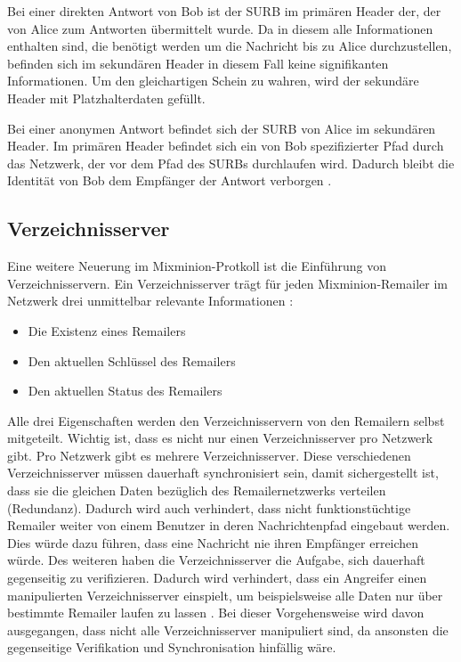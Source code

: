 Bei einer direkten Antwort von Bob ist der SURB im primären Header der, der von Alice zum Antworten übermittelt wurde. Da in diesem alle Informationen enthalten sind, die benötigt werden um die Nachricht bis zu Alice durchzustellen, befinden sich im sekundären Header in diesem Fall keine signifikanten Informationen. Um den gleichartigen Schein zu wahren, wird der sekundäre Header mit Platzhalterdaten gefüllt.

Bei einer anonymen Antwort befindet sich der SURB von Alice im sekundären Header. Im primären Header befindet sich ein von Bob spezifizierter Pfad durch das Netzwerk, der vor dem Pfad des SURBs durchlaufen wird. Dadurch bleibt die Identität von Bob dem Empfänger der Antwort verborgen \cite[S. 4]{mixminion}.

\subsection{Verzeichnisserver}
Eine weitere Neuerung im Mixminion-Protkoll ist die Einführung von Verzeichnisservern. Ein Verzeichnisserver trägt für jeden Mixminion-Remailer im Netzwerk drei unmittelbar relevante Informationen \cite[S. 8]{mixminion}:
\begin{itemize}
\item Die Existenz eines Remailers
\item Den aktuellen Schlüssel des Remailers
\item Den aktuellen Status des Remailers
\end{itemize}

Alle drei Eigenschaften werden den Verzeichnisservern von den Remailern selbst mitgeteilt.
Wichtig ist, dass es nicht nur einen Verzeichnisserver pro Netzwerk gibt. Pro Netzwerk gibt es mehrere Verzeichnisserver. Diese verschiedenen Verzeichnisserver müssen dauerhaft synchronisiert sein, damit sichergestellt ist, dass sie die gleichen Daten bezüglich des Remailernetzwerks verteilen (Redundanz). Dadurch wird auch verhindert, dass nicht funktionstüchtige Remailer weiter von einem Benutzer in deren Nachrichtenpfad eingebaut werden. Dies würde dazu führen, dass eine Nachricht nie ihren Empfänger erreichen würde. Des weiteren haben die Verzeichnisserver die Aufgabe, sich dauerhaft gegenseitig zu verifizieren. Dadurch wird verhindert, dass ein Angreifer einen manipulierten Verzeichnisserver einspielt, um beispielsweise alle Daten nur über bestimmte Remailer laufen zu lassen \cite[S. 9]{mixminion}. Bei dieser Vorgehensweise wird davon ausgegangen, dass nicht alle Verzeichnisserver manipuliert sind, da ansonsten die gegenseitige Verifikation und Synchronisation hinfällig wäre.


